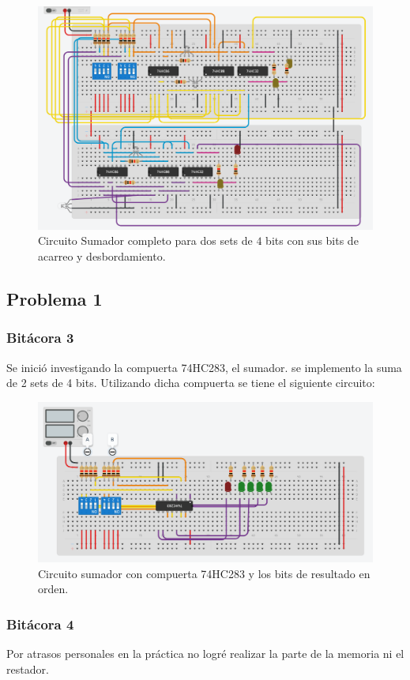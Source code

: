 \begin{figure}[H]
	\centering
	\includegraphics[scale=0.25]{Images/Parte1SC2.png}
	\caption{Circuito Sumador completo para dos sets de $4$ bits con sus bits de acarreo y desbordamiento.}
	\label{p1sc2}
\end{figure}




\subsection{Problema 1}
\subsubsection{Bitácora 3}

Se inició investigando la compuerta 74HC283, el sumador. se implemento la suma de 2 sets de 4 bits. Utilizando dicha compuerta se tiene el siguiente circuito:

\begin{figure}[H]
	\centering
	\includegraphics[scale=0.5]{Images/Parte2SC1.png}
	\caption{Circuito sumador con compuerta 74HC283 y los bits de resultado en orden.}
	\label{p2sc1}
\end{figure}


\subsubsection{Bitácora 4}
Por atrasos personales en la práctica no logré realizar la parte de la memoria ni el restador.















